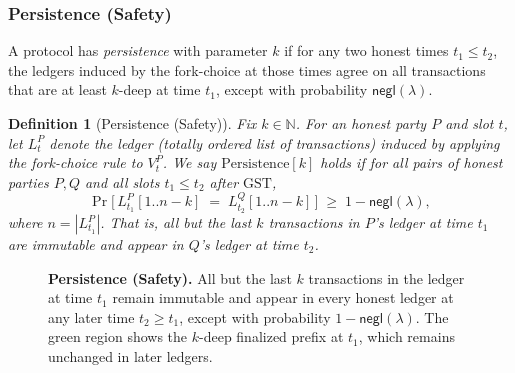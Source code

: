 \documentclass[11pt]{article}
\newtheorem{definition}[theorem]{Definition}
\newcommand{\negl}{\ensuremath{\mathsf{negl}}\xspace}
\begin{document}

\subsubsection{Persistence (Safety)}


A protocol has \emph{persistence} with parameter $k$ if for any two honest times $t_1\le t_2$,
the ledgers induced by the fork-choice at those times agree on all transactions that are at least $k$-deep at time $t_1$,
except with probability $\negl(\lambda)$.

\begin{definition}[Persistence (Safety)]
Fix $k \in \mathbb{N}$. For an honest party $P$ and slot $t$, let $L_t^P$ denote
the ledger (totally ordered list of transactions) induced by applying the fork-choice
rule to $V_t^P$. We say $\mathrm{Persistence}[k]$ holds if for all pairs of honest
parties $P,Q$ and all slots $t_1 \le t_2$ after $\mathrm{GST}$,
\[
\Pr\!\Big[\, L_{t_1}^P[1..n-k] \;=\; L_{t_2}^Q[1..n-k] \,\Big] \;\ge\; 1-\negl(\lambda),
\]
where $n=|L_{t_1}^P|$. That is, all but the last $k$ transactions in $P$'s ledger
at time $t_1$ are immutable and appear in $Q$'s ledger at time $t_2$.
\end{definition}

\begin{figure}[htp!]
\centering
{}
\caption{\textbf{Persistence (Safety).} 
\small 
All but the last $k$ transactions in the ledger at time $t_1$ remain immutable and appear in every honest ledger at any later time $t_2\ge t_1$, except with probability $1-\negl(\lambda)$. 
The green region shows the $k$-deep finalized prefix at $t_1$, which remains unchanged in later ledgers.}

\label{fig:persistence}
\end{figure}
\end{document}
